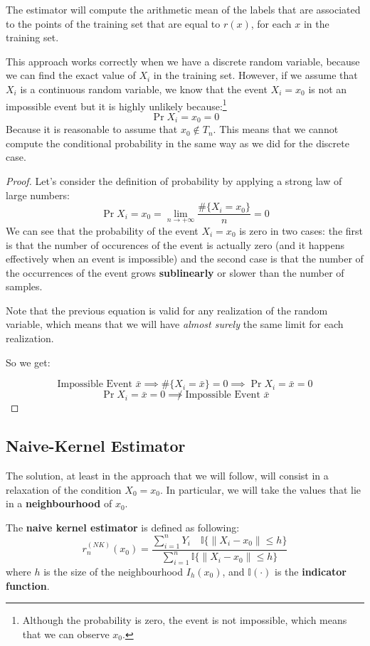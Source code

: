 The estimator will compute the arithmetic mean of the labels that are associated to the points of the training set that are equal to $r(x)$, for each $x$ in the training set.

This approach works correctly when we have a discrete random variable, because we can find the exact value of $X_i$ in the training set. However, if we assume that $X_i$ is a continuous random variable, we know that the event $X_i = x_0$ is not an impossible event but it is highly unlikely because:\footnote{Although the probability is zero, the event is not impossible, which means that we can observe $x_0$.}
\[
    \Pr{X_i = x_0} = 0
\]
Because it is reasonable to assume that $x_0 \notin T_n$. This means that we cannot compute the conditional probability in the same way as we did for the discrete case.

\begin{proof}
    Let's consider the definition of probability by applying a strong law of large numbers:
    \[
        \Pr{X_i = x_0} = \lim_{n \to +\infty} \frac{\#\{X_i = x_0\}}{n} = 0
    \]
    We can see that the probability of the event $X_i = x_0$ is zero in two cases: the first is that the number of occurences of the event is actually zero (and it happens effectively when an event is impossible) and the second case is that the number of the occurrences of the event grows \textbf{sublinearly} or slower than the number of samples.

    Note that the previous equation is valid for any realization of the random variable, which means that we will have \textit{almost surely} the same limit for each realization.

    So we get:

    \[
        \text{Impossible Event } \bar x \implies \#\{X_i=\bar x\} = 0\implies \Pr{X_i = \bar x} = 0     
    \]
    \[
        \Pr{X_i = \bar x} = 0 \not\implies \text{Impossible Event }\bar x
    \]
\end{proof}
\subsection{Naive-Kernel Estimator}
The solution, at least in the approach that we will follow, will consist in a relaxation of the condition $X_0 = x_0$. In particular, we will take the values that lie in a \textbf{neighbourhood} of $x_0$.
\begin{definition}
    The \textbf{naive kernel estimator} is defined as following:
    \[
        r_n^{(NK)}(x_0) = \frac{\sum_{i=1}^n Y_i \quad \mathbb{I}\{\lVert X_i - x_0 \rVert \leq h\} }{\sum_{i=1}^n \mathbb{I}\{\lVert X_i - x_0 \rVert \leq h\}}
    \]
    where $h$ is the size of the neighbourhood $I_h(x_0)$, and $\mathbb{I}(\cdot)$ is the \textbf{indicator function}.
\end{definition}

